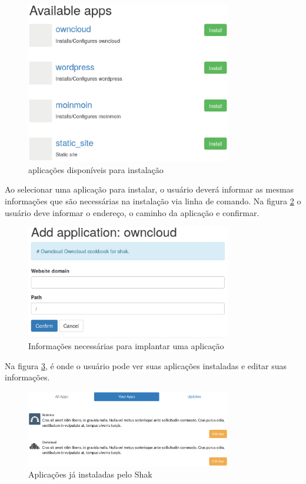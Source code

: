 \begin{figure}[H]
  \centering
  \includegraphics[width=0.8\textwidth]
      {figuras/shak1-2}
      \caption{aplicações disponíveis para instalação}
  \label{fig:shakx1.2}
\end{figure}

Ao selecionar uma aplicação para instalar, o usuário deverá informar as mesmas
informações que são necessárias na instalação via linha de comando. Na figura \ref{fig:shakxx}
o usuário deve informar o endereço, o caminho da aplicação e confirmar.

\begin{figure}[h]
  \centering
  \includegraphics[width=0.8\textwidth]
      {figuras/shakx}
      \caption{Informações necessárias para implantar uma aplicação}
  \label{fig:shakxx}
\end{figure}

Na figura \ref{fig:shakx2}, é onde o usuário pode ver suas aplicações instaladas e editar
suas informações.

\begin{figure}[H]
  \centering
  \includegraphics[width=0.8\textwidth]
      {figuras/shak2}
      \caption{Aplicações já instaladas pelo Shak}
    \label{fig:shakx2}
\end{figure}

